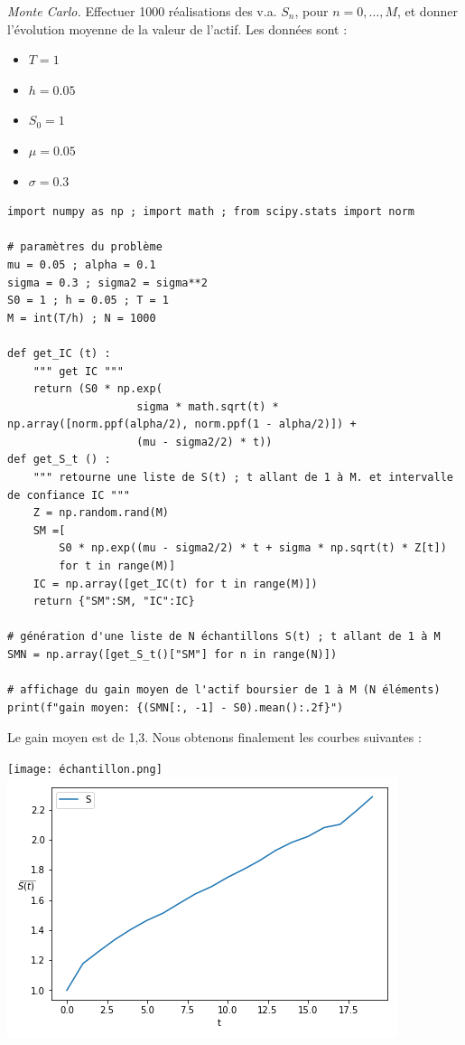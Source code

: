 \documentclass[answers, 10pt]{exam}
\begin{document}
\begin{questions}
	\question
	
	\textit{Monte Carlo.} Effectuer 1000 réalisations des v.a. $S_n$, pour
	$n=0,\dots,M$, et donner l'évolution moyenne de la valeur de l'actif.
	Les données sont : 
	
	\begin{itemize}
		\item $T=1$
		\item $h = 0.05$
		\item $S_0 = 1$
		\item $\mu = 0.05$
		\item $ \sigma = 0.3$
	\end{itemize}

	\begin{solutionorbox}
	\begin{verbatim}
import numpy as np ; import math ; from scipy.stats import norm

# paramètres du problème
mu = 0.05 ; alpha = 0.1
sigma = 0.3 ; sigma2 = sigma**2
S0 = 1 ; h = 0.05 ; T = 1
M = int(T/h) ; N = 1000

def get_IC (t) :
    """ get IC """    
    return (S0 * np.exp(
                    sigma * math.sqrt(t) * np.array([norm.ppf(alpha/2), norm.ppf(1 - alpha/2)]) + 
                    (mu - sigma2/2) * t))
def get_S_t () :
    """ retourne une liste de S(t) ; t allant de 1 à M. et intervalle de confiance IC """
    Z = np.random.rand(M)
    SM =[
        S0 * np.exp((mu - sigma2/2) * t + sigma * np.sqrt(t) * Z[t])
        for t in range(M)]
    IC = np.array([get_IC(t) for t in range(M)])
    return {"SM":SM, "IC":IC}

# génération d'une liste de N échantillons S(t) ; t allant de 1 à M
SMN = np.array([get_S_t()["SM"] for n in range(N)])

# affichage du gain moyen de l'actif boursier de 1 à M (N éléments)
print(f"gain moyen: {(SMN[:, -1] - S0).mean():.2f}")

\end{verbatim}
		
Le gain  moyen est de 1,3. Nous obtenons finalement les courbes suivantes :

\texttt{[image: échantillon.png]}
\includegraphics[width=0.45\linewidth]{moyenne.png}

\end{solutionorbox}
\end{questions}
\end{document}
